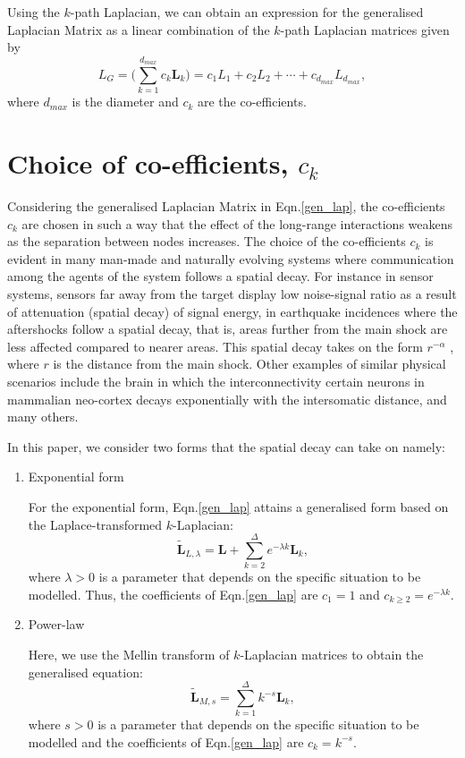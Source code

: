 \documentclass[12pt]{article}
\begin{document}
Using the $k$-path Laplacian, we can obtain an expression for the generalised Laplacian Matrix as a linear combination of the $k$-path Laplacian matrices given by 
\begin{equation}
L_{G} =  \Big(\sum_{k=1}^{d_{max}}c_k\mathbf{L}_{k} \Big) = c_{1}L_{1} + c_{2}L_{2} + \cdots + c_{d_{max}}L_{d_{max}}, 
\label{gen_lap}
\end{equation}
where $d_{max}$ is the diameter and $c_k$ are the co-efficients.

\section{Choice of co-efficients, $c_k$}
Considering the generalised Laplacian Matrix in Eqn.\ref{gen_lap}, the co-efficients $c_k$ are chosen in such a way that the effect of the long-range interactions weakens as the separation between nodes increases. The choice of the co-efficients $c_k$ is evident in many man-made and naturally evolving systems where communication among the agents of the system follows a spatial decay. For instance in sensor systems, sensors far away from the target display low noise-signal ratio as a result of attenuation (spatial decay) of signal energy, in earthquake incidences where the aftershocks follow a spatial decay, that is, areas further from the main shock are less affected compared to nearer areas. This spatial decay takes on the form $r ^{-\alpha}$ , where $r$ is the distance from the main shock. Other examples of similar physical scenarios include the brain in which the interconnectivity certain neurons in mammalian neo-cortex decays exponentially with the intersomatic distance, and many others.

In this paper, we consider two forms that the spatial decay can take on namely: 
\begin{enumerate}
	\item Exponential form
	
	For the exponential form, Eqn.\ref{gen_lap} attains a generalised form based on the Laplace-transformed $k$-Laplacian:
	\begin{equation}
	\tilde{\mathbf{L}}_{L,\lambda} = \mathbf{L} + \sum_{k=2}^{\Delta} e^{-\lambda k} \mathbf{L}_k, 
	\label{laplacetransform}
	\end{equation}
	where $\lambda >0$ is a parameter that depends on the specific situation to be modelled.
	Thus, the coefficients of Eqn.\ref{gen_lap} are $c_1 = 1$ and $c_{k \geq 2} = e^{-\lambda k}$.
	
	\item Power-law 
	
	Here, we use the Mellin transform of $k$-Laplacian matrices to obtain the generalised equation:
	\begin{equation}
	\tilde{\mathbf{L}}_{M,s} = \sum_{k=1}^{\Delta} k^{-s} \mathbf{L}_k,
	\label{mellin-transforms}
	\end{equation}
	where $s >0$ is a parameter that depends on the specific situation to be modelled and the coefficients of Eqn.\ref{gen_lap} are $c_{k} = k^{-s}$.     
\end{enumerate}
\end{document}
